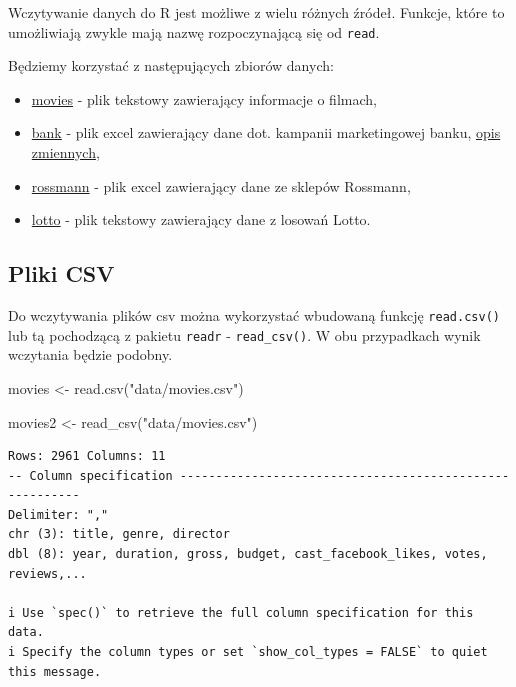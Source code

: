 \documentclass[
  letterpaper,
  DIV=11,
  numbers=noendperiod]{scrreprt}
\newenvironment{Shaded}{\begin{snugshade}}{\end{snugshade}}
\newcommand{\FunctionTok}[1]{\textcolor[rgb]{0.28,0.35,0.67}{#1}}
\newcommand{\NormalTok}[1]{\textcolor[rgb]{0.00,0.23,0.31}{#1}}
\newcommand{\OtherTok}[1]{\textcolor[rgb]{0.00,0.23,0.31}{#1}}
\newcommand{\StringTok}[1]{\textcolor[rgb]{0.13,0.47,0.30}{#1}}
\providecommand{\tightlist}{%
  \setlength{\itemsep}{0pt}\setlength{\parskip}{0pt}}\usepackage{longtable,booktabs,array}
\begin{document}
Wczytywanie danych do R jest możliwe z wielu różnych źródeł. Funkcje,
które to umożliwiają zwykle mają nazwę rozpoczynającą się od
\texttt{read}.

Będziemy korzystać z następujących zbiorów danych:

\begin{itemize}
\tightlist
\item
  \href{data/movies.csv}{movies} - plik tekstowy zawierający informacje
  o filmach,
\item
  \href{data/bank.xlsx}{bank} - plik excel zawierający dane dot.
  kampanii marketingowej banku, \href{data/bank_opis.pdf}{opis
  zmiennych},
\item
  \href{data/rossmann.xlsx}{rossmann} - plik excel zawierający dane ze
  sklepów Rossmann,
\item
  \href{http://www.mbnet.com.pl/dl.txt}{lotto} - plik tekstowy
  zawierający dane z losowań Lotto.
\end{itemize}

\hypertarget{pliki-csv}{%
\subsection{Pliki CSV}\label{pliki-csv}}

Do wczytywania plików csv można wykorzystać wbudowaną funkcję
\texttt{read.csv()} lub tą pochodzącą z pakietu \texttt{readr} -
\texttt{read\_csv()}. W obu przypadkach wynik wczytania będzie podobny.

\begin{Shaded}
\begin{Highlighting}[]
\NormalTok{movies }\OtherTok{\textless{}{-}} \FunctionTok{read.csv}\NormalTok{(}\StringTok{"data/movies.csv"}\NormalTok{)}

\NormalTok{movies2 }\OtherTok{\textless{}{-}} \FunctionTok{read\_csv}\NormalTok{(}\StringTok{"data/movies.csv"}\NormalTok{)}
\end{Highlighting}
\end{Shaded}

\begin{verbatim}
Rows: 2961 Columns: 11
-- Column specification --------------------------------------------------------
Delimiter: ","
chr (3): title, genre, director
dbl (8): year, duration, gross, budget, cast_facebook_likes, votes, reviews,...

i Use `spec()` to retrieve the full column specification for this data.
i Specify the column types or set `show_col_types = FALSE` to quiet this message.
\end{verbatim}
\end{document}
